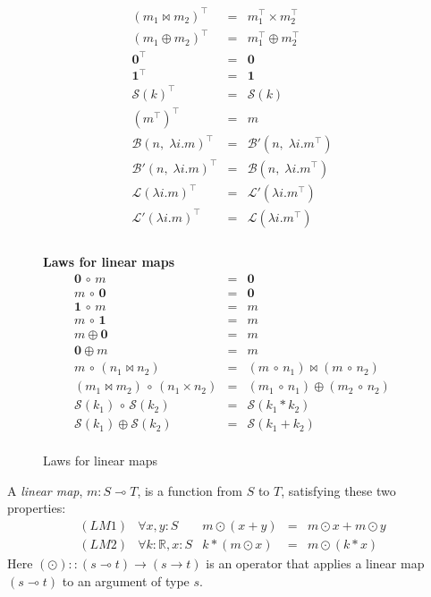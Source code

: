 \documentclass[sigplan,review]{acmart}
\renewcommand{\to}{\rightarrow}    %
\newcommand{\linto}{\multimap}     %
\newcommand{\typ}[2]{#1 \! : \! #2}  %
\newcommand{\real}{\mathbb{R}}       %
\newcommand{\lmapply}{\odot}   %
\newcommand{\lmcomp}{\,\circ\,}   %
\newcommand{\lmtrans}[1]{#1^{\top}}   %
\newcommand{\lmpair}{\times}         %
\newcommand{\lmjoin}{\bowtie}        %
\newcommand{\lmadd}{\oplus}        %
\newcommand{\lmzero}{\mathbf{0}}     %
\newcommand{\lmone}{\mathbf{1}}      %
\newcommand{\lmscalar}[1]{{\mathcal S}(#1)}      %
\newcommand{\lmlam}{{\mathcal L}}      %
\newcommand{\lmlamt}{{\mathcal L'}}     %
\newcommand{\lmbuild}{\mathcal B}             %
\newcommand{\lmbuildt}{\mathcal B'}             %
\begin{document}
\begin{figure}
{\begin{minipage}{\columnwidth}
$$\begin{array}{rcll}
    \lmtrans{(m_1 \lmjoin m_2)} & = & \lmtrans{m_1} \lmpair \lmtrans{m_2} \\
    \lmtrans{(m_1 \lmadd m_2)} & = & \lmtrans{m_1} \lmadd \lmtrans{m_2} \\
    \lmtrans{\lmzero} & = & \lmzero \\
    \lmtrans{\lmone} & = & \lmone \\
    \lmtrans{\lmscalar{k}} & = & \lmscalar{k} \\
    \lmtrans{(\lmtrans{m})} & = & m \\
    \lmtrans{\lmbuild( n,\; \lambda i. m )} & = & \lmbuildt( n,\; \lambda i. \lmtrans{m} ) \\
    \lmtrans{\lmbuildt( n,\; \lambda i. m )} & = & \lmbuild( n,\; \lambda i. \lmtrans{m} ) \\
   \lmtrans{\lmlam(\lambda i. m)} & = & \lmlamt(\lambda i. \lmtrans{m}) \\
   \lmtrans{\lmlamt(\lambda i. m)} & = & \lmlam(\lambda i. \lmtrans{m}) \\
  \end{array}
  $$
\\[3mm]
  {\bf Laws for linear maps}
  $$
  \begin{array}{rcl}
    \lmzero \lmcomp m & = & \lmzero \\
    m \lmcomp \lmzero & = & \lmzero \\
    \lmone \lmcomp m & = & m \\
    m \lmcomp \lmone & = & m \\
    m \lmadd \lmzero & = & m \\
    \lmzero \lmadd m & = & m \\
    m \lmcomp (n_1 \lmjoin n_2) & = & (m \lmcomp n_1) \lmjoin (m \lmcomp n_2) \\
    (m_1 \lmjoin m_2) \lmcomp (n_1 \lmpair n_2) & = & (m_1 \lmcomp n_1) \lmadd (m_2 \lmcomp n_2) \\
    \lmscalar{k_1} \lmcomp \lmscalar{k_2} & = & \lmscalar{ k_1 * k_2 } \\
    \lmscalar{k_1} \lmadd \lmscalar{k_2} & = & \lmscalar{ k_1 + k_2 } \\
  \end{array}
  $$
    \end{minipage}
    }
    \caption{Laws for linear maps} \label{fig:lm-laws}
\end{figure}

A \emph{linear map}, $m : S \linto T$, is a function from $S$ to $T$,
satisfying these two properties:
$$
\begin{array}{lrrcl}
(LM1) & \forall \typ{x,y}{S} &  m \lmapply (x+y) & = & m \lmapply x + m \lmapply y \\
(LM2) & \forall \typ{k}{\real}, \typ{x}{S} & k * (m \lmapply x) & = & m \lmapply (k * x)
\end{array}
$$
Here $(\lmapply) :: (s \linto t) \to (s \to t)$ is an operator that applies a linear map $(s \linto t)$
to an argument of type $s$.
\end{document}
